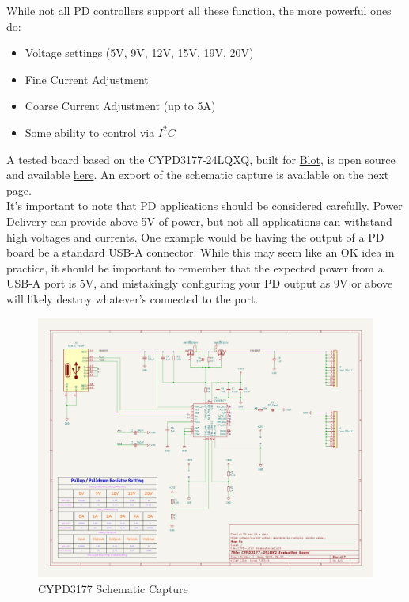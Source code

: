 \documentclass[12pt]{article}
\begin{document}
\noindent
While not all PD controllers support all these function, the more powerful ones do:
\begin{itemize}
	\item Voltage settings (5V, 9V, 12V, 15V, 19V, 20V)
	\item Fine Current Adjustment 
	\item Coarse Current Adjustment (up to 5A)
	\item Some ability to control via $I^2 C$\\
\end{itemize}

\noindent
A tested board based on the CYPD3177-24LQXQ, built for \href{https://github.com/hackclub/blot/tree/main}{Blot}, is open source and available \href{https://github.com/Hugoyhu/CYPD3177-Breakout}{here}. An export of the schematic capture is available on the next page.\\

\noindent
It's important to note that PD applications should be considered carefully. Power Delivery can provide above 5V of power, but not all applications can withstand high voltages and currents. One example would be having the output of a PD board be a standard USB-A connector. While this may seem like an OK idea in practice, it should be important to remember that the expected power from a USB-A port is 5V, and mistakingly configuring your PD output as 9V or above will likely destroy whatever's connected to the port.
 
\newpage
\begin{figure}[h]
	\centering
	\includegraphics[width=\linewidth]{CYPD3177_sch.png}
	\caption{CYPD3177 Schematic Capture\protect\footnotemark}
	\label{fig:cypd3177_sch}
\end{figure}
\end{document}
